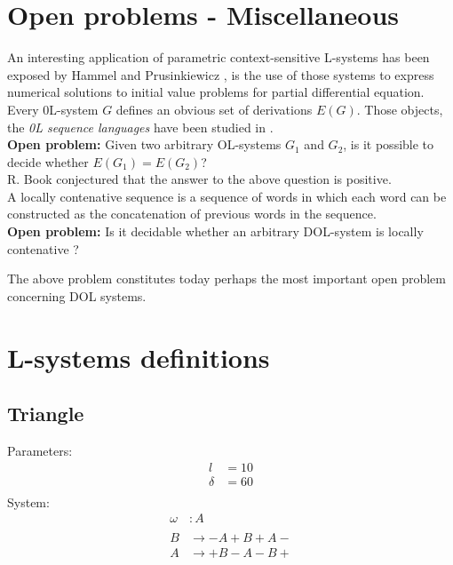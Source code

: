 \documentclass[10pt, letterpaper, twoside]{article}
\begin{document}
\begin{multicols}{2}
\section*{Open problems - Miscellaneous}

An interesting application of parametric context-sensitive L-systems has been
exposed by Hammel and Prusinkiewicz \cite{diff-eq}, is the use of those systems
to express numerical solutions to initial value problems for partial
differential equation.
\\

Every 0L-system $G$ defines an obvious set of derivations $E(G)$. Those
objects, the \textit{0L sequence languages} have been studied in
\cite{ROZENBERG1980195}.\\
\textbf{Open problem:} Given two arbitrary OL-systems $G_1$ and $G_2$, is it
possible to decide whether $E(G_1) = E(G_2)$?\\R. Book conjectured that the
answer to the above question is positive. \\

A locally contenative sequence is a sequence of words in which each word can be
constructed as the concatenation of previous words in the sequence.\\
\textbf{Open problem:} Is it decidable whether an arbitrary DOL-system is
locally contenative ?

The above problem constitutes today perhaps the most important open
problem concerning DOL systems.



\newpage
\appendix
\section{L-systems definitions}\label{app:ldef}
\subsection{Triangle}\label{app:tri}
Parameters:
\begin{equation}
    \begin{aligned}
        l & =10 \\
        \delta & = 60 \\
    \end{aligned}
\end{equation}
System:
\begin{equation}
    \begin{aligned}
        \omega & : A \\
        \\
        B & \rightarrow -A+B+A- \\
        A & \rightarrow +B-A-B+ \\
    \end{aligned}
\end{equation}


\end{multicols}
\end{document}

